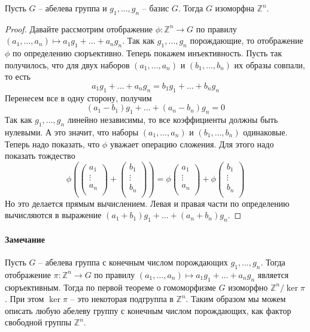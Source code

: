 \begin{claim}
\label{claim::FreeAb}
Пусть $G$ -- абелева группа и $g_1,\ldots, g_n$ -- базис $G$.
Тогда $G$ изоморфна $\mathbb Z^{n}$.
\end{claim}
\begin{proof}
Давайте рассмотрим отображение $\phi \colon \mathbb Z^n \to G$ по правилу $(a_1,\ldots,a_n) \mapsto a_1 g_1+ \ldots + a_n g_n$.
Так как $g_1,\ldots, g_n$ порождающие, то отображение $\phi$ по определению сюръективно.
Теперь покажем инъективность.
Пусть так получилось, что для двух наборов $(a_1,\ldots,a_n)$ и $(b_1,\ldots,b_n)$ их образы совпали, то есть
\[
a_1 g_1 + \ldots + a_n g_n = b_1 g_1 + \ldots + b_n g_n
\]
Перенесем все в одну сторону, получим
\[
(a_1 - b_1) g_1 + \ldots + (a_n - b_n) g_n = 0
\]
Так как $g_1,\ldots, g_n$ линейно независимы, то все коэффициенты должны быть нулевыми.
А это значит, что наборы $(a_1,\ldots,a_n)$ и $(b_1,\ldots,b_n)$ одинаковые.
Теперь надо показать, что $\phi$ уважает операцию сложения.
Для этого надо показать тождество
\[
\phi
\left(
\begin{pmatrix}
a_1\\\vdots\\a_n\\
\end{pmatrix}
+
\begin{pmatrix}
b_1\\\vdots\\b_n\\
\end{pmatrix}
\right)
=
\phi
\begin{pmatrix}
a_1\\\vdots\\a_n\\
\end{pmatrix}
+
\phi
\begin{pmatrix}
b_1\\\vdots\\b_n\\
\end{pmatrix}
\]
Но это делается прямым вычислением.
Левая и правая части по определению вычисляются в выражение $(a_1 + b_1) g_1 + \ldots + (a_n + b_n) g_n$.
\end{proof}

\paragraph{Замечание}

Пусть $G$ -- абелева группа с конечным числом порождающих $g_1,\ldots, g_n$.
Тогда отображение $\pi \colon \mathbb Z^n \to G$ по правилу $(a_1,\ldots,a_n) \mapsto a_1 g_1 + \ldots + a_n g_n$ является сюръективным.
Тогда по первой теореме о гомоморфизме $G$ изоморфно $\mathbb Z^n / \ker \pi$.
При этом $\ker \pi$ -- это некоторая подгруппа в $\mathbb Z^n$.
Таким образом мы можем описать любую абелеву группу с конечным числом порождающих, как фактор свободной группы $\mathbb Z^n$.

